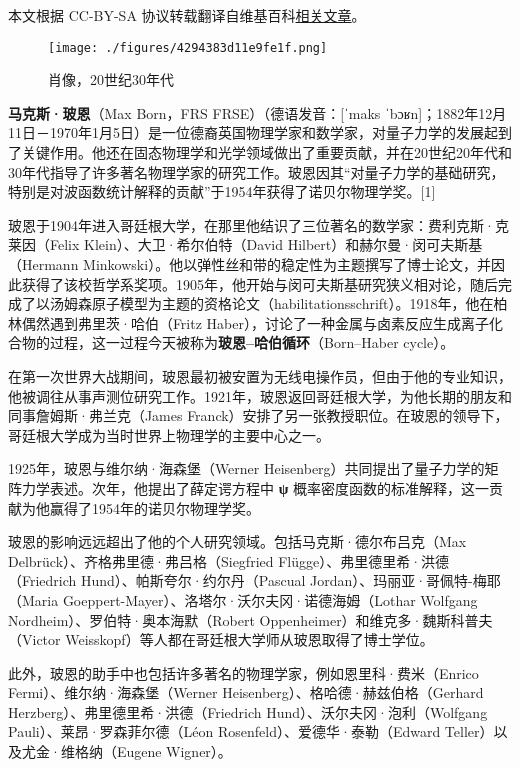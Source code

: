 
本文根据 CC-BY-SA 协议转载翻译自维基百科\href{https://en.wikipedia.org/wiki/Max_Born}{相关文章}。
\begin{figure}[ht]
\centering
\texttt{[image: ./figures/4294383d11e9fe1f.png]}
\caption{肖像，20世纪30年代} \label{fig_BE_1}
\end{figure}
\textbf{马克斯·玻恩}（Max Born，FRS FRSE）（德语发音：[ˈmaks ˈbɔʁn]；1882年12月11日－1970年1月5日）是一位德裔英国物理学家和数学家，对量子力学的发展起到了关键作用。他还在固态物理学和光学领域做出了重要贡献，并在20世纪20年代和30年代指导了许多著名物理学家的研究工作。玻恩因其“对量子力学的基础研究，特别是对波函数统计解释的贡献”于1954年获得了诺贝尔物理学奖。[1]

玻恩于1904年进入哥廷根大学，在那里他结识了三位著名的数学家：费利克斯·克莱因（Felix Klein）、大卫·希尔伯特（David Hilbert）和赫尔曼·闵可夫斯基（Hermann Minkowski）。他以弹性丝和带的稳定性为主题撰写了博士论文，并因此获得了该校哲学系奖项。1905年，他开始与闵可夫斯基研究狭义相对论，随后完成了以汤姆森原子模型为主题的资格论文（habilitationsschrift）。1918年，他在柏林偶然遇到弗里茨·哈伯（Fritz Haber），讨论了一种金属与卤素反应生成离子化合物的过程，这一过程今天被称为\textbf{玻恩–哈伯循环}（Born–Haber cycle）。

在第一次世界大战期间，玻恩最初被安置为无线电操作员，但由于他的专业知识，他被调往从事声测位研究工作。1921年，玻恩返回哥廷根大学，为他长期的朋友和同事詹姆斯·弗兰克（James Franck）安排了另一张教授职位。在玻恩的领导下，哥廷根大学成为当时世界上物理学的主要中心之一。

1925年，玻恩与维尔纳·海森堡（Werner Heisenberg）共同提出了量子力学的矩阵力学表述。次年，他提出了薛定谔方程中 \textbf{ψ\ψ} 概率密度函数的标准解释，这一贡献为他赢得了1954年的诺贝尔物理学奖。

玻恩的影响远远超出了他的个人研究领域。包括马克斯·德尔布吕克（Max Delbrück）、齐格弗里德·弗吕格（Siegfried Flügge）、弗里德里希·洪德（Friedrich Hund）、帕斯夸尔·约尔丹（Pascual Jordan）、玛丽亚·哥佩特-梅耶（Maria Goeppert-Mayer）、洛塔尔·沃尔夫冈·诺德海姆（Lothar Wolfgang Nordheim）、罗伯特·奥本海默（Robert Oppenheimer）和维克多·魏斯科普夫（Victor Weisskopf）等人都在哥廷根大学师从玻恩取得了博士学位。

此外，玻恩的助手中也包括许多著名的物理学家，例如恩里科·费米（Enrico Fermi）、维尔纳·海森堡（Werner Heisenberg）、格哈德·赫兹伯格（Gerhard Herzberg）、弗里德里希·洪德（Friedrich Hund）、沃尔夫冈·泡利（Wolfgang Pauli）、莱昂·罗森菲尔德（Léon Rosenfeld）、爱德华·泰勒（Edward Teller）以及尤金·维格纳（Eugene Wigner）。

